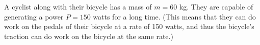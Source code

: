 \documentclass[12pt]{article}
\begin{document}
%
%


%
%
%
%


A cyclist along with their bicycle has a mass of $m=60$ kg. They are capable of generating a power $P=150$ watts for a long time. (This means that they can do work on the pedals of their bicycle at a rate of 150 watts, and thus the bicycle's traction can do work on the bicycle at the same rate.)
\end{document}
